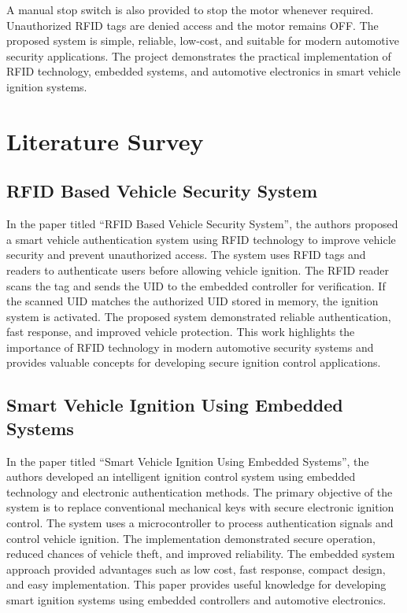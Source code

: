 \documentclass[12pt,a4paper,oneside]{report}
\begin{document}
A manual stop switch is also provided to stop the motor whenever required. Unauthorized RFID tags are denied access and the motor remains OFF. The proposed system is simple, reliable, low-cost, and suitable for modern automotive security applications. The project demonstrates the practical implementation of RFID technology, embedded systems, and automotive electronics in smart vehicle ignition systems.



\chapter{Literature Survey}

\section{RFID Based Vehicle Security System}

In the paper titled “RFID Based Vehicle Security System”, the authors proposed a smart vehicle authentication system using RFID technology to improve vehicle security and prevent unauthorized access. The system uses RFID tags and readers to authenticate users before allowing vehicle ignition. The RFID reader scans the tag and sends the UID to the embedded controller for verification. If the scanned UID matches the authorized UID stored in memory, the ignition system is activated. The proposed system demonstrated reliable authentication, fast response, and improved vehicle protection. This work highlights the importance of RFID technology in modern automotive security systems and provides valuable concepts for developing secure ignition control applications.

\section{Smart Vehicle Ignition Using Embedded Systems}

In the paper titled “Smart Vehicle Ignition Using Embedded Systems”, the authors developed an intelligent ignition control system using embedded technology and electronic authentication methods. The primary objective of the system is to replace conventional mechanical keys with secure electronic ignition control. The system uses a microcontroller to process authentication signals and control vehicle ignition. The implementation demonstrated secure operation, reduced chances of vehicle theft, and improved reliability. The embedded system approach provided advantages such as low cost, fast response, compact design, and easy implementation. This paper provides useful knowledge for developing smart ignition systems using embedded controllers and automotive electronics.
\end{document}
